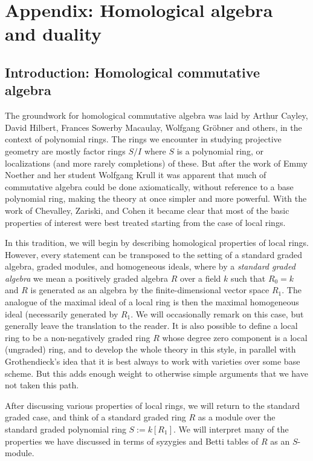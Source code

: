 

\chapter{Appendix: Homological algebra and duality}\label{CA appendix}

\section{Introduction: Homological commutative algebra} 

The groundwork for homological commutative algebra was laid by Arthur Cayley, David Hilbert, Frances Sowerby Macaulay, Wolfgang Gr\"obner and others, in the context of polynomial rings. The rings we encounter in studying projective geometry are mostly factor rings $S/I$ where $S$ is a polynomial ring, or localizations (and more rarely completions) of these. But after the work of Emmy Noether and her student Wolfgang Krull it was apparent that much of commutative algebra could be done axiomatically, without reference to a base polynomial ring, making the theory at once simpler and more powerful. With the work of Chevalley, Zariski, and Cohen it became clear that most of the basic properties of interest were best treated starting from the case of local rings.

In this tradition, we will begin by describing homological properties of local rings. 
However, every statement can be transposed to the setting of a standard graded algebra, graded modules, and homogeneous ideals, where by a \emph{standard graded algebra} we mean a positively graded algebra $R$ over a field $k$ such that $R_{0} = k$ and $R$ is generated as an algebra by the finite-dimensional vector space $R_{1}$. The analogue of the maximal ideal of a local ring is then the maximal homogeneous ideal (necessarily generated by $R_{1}$. We will occasionally remark on this case, but generally leave the translation to the reader. It is also possible to define a local ring to be a non-negatively graded ring $R$ whose degree zero component is a local (ungraded) ring, and to develop the whole theory in this style, in parallel with Grothendieck's idea that it is best always to work with varieties over some base scheme. But this adds enough weight to otherwise simple arguments that we have not taken this path. 

After discussing various properties of local rings, we will return to the standard graded case, and think of a standard graded ring $R$ as a module over the standard graded polynomial ring $S := k[R_1]$. We will interpret many of the properties we have discussed in terms of syzygies and Betti tables of $R$ as an $S$-module.

